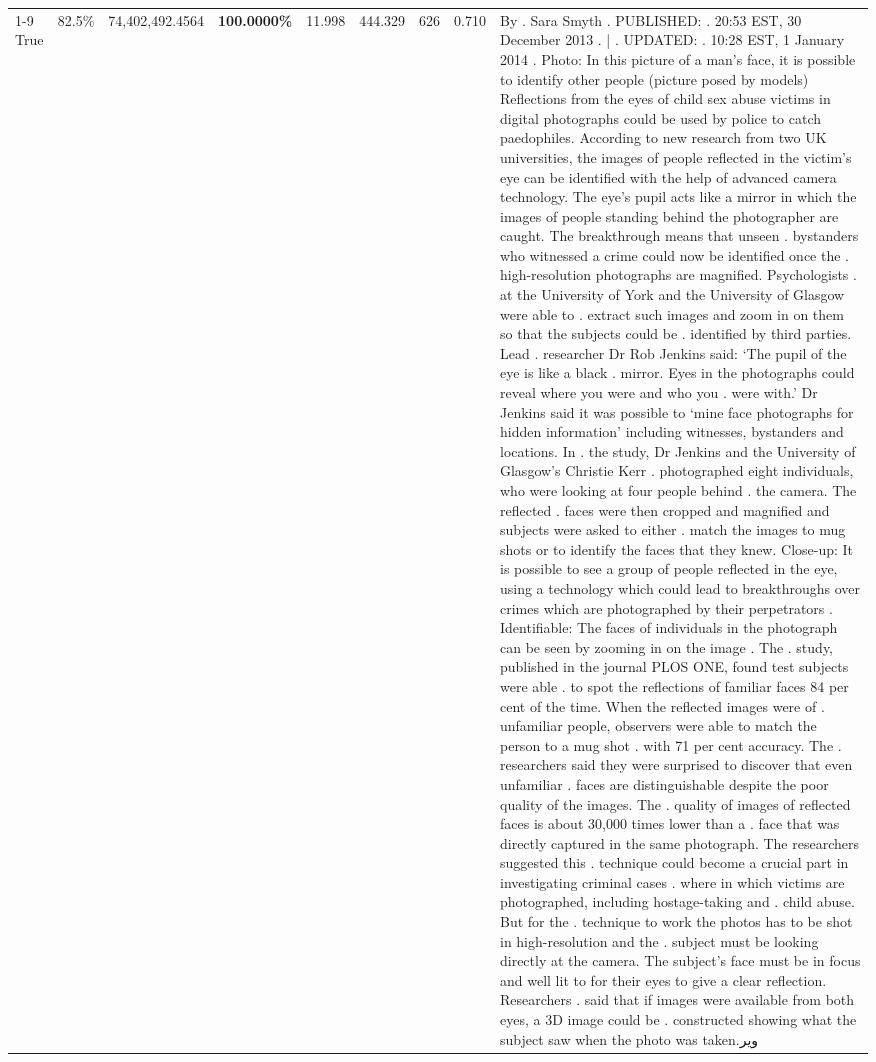 \begin{table}[H]
\begin{tabular}{lllrlllll}
\cline{1-9}
True & 82.5\% & 74,402,492.4564 & \bfseries \color{red} 100.0000\% & 11.998 & 444.329 & 626 & 0.710 & By . Sara Smyth . PUBLISHED: . 20:53 EST, 30 December 2013 . | . UPDATED: . 10:28 EST, 1 January 2014 . Photo: In this picture of a man's face, it is possible to identify other people (picture posed by models) Reflections from the eyes of child sex abuse victims in digital photographs could be used by police to catch paedophiles. According to new research from two UK universities, the images of people reflected in the victim's eye can be identified with the help of advanced camera technology. The eye's pupil acts like a mirror in which the images of people standing behind the photographer are caught. The breakthrough means that unseen . bystanders who witnessed a crime could now be identified once the . high-resolution photographs are magnified. Psychologists . at the University of York and the University of Glasgow were able to . extract such images and zoom in on them so that the subjects could be . identified by third parties. Lead . researcher Dr Rob Jenkins said: ‘The pupil of the eye is like a black . mirror. Eyes in the photographs could reveal where you were and who you . were with.' Dr Jenkins said it was possible to ‘mine face photographs for hidden information' including witnesses, bystanders and locations. In . the study, Dr Jenkins and the University of Glasgow's Christie Kerr . photographed eight individuals, who were looking at four people behind . the camera. The reflected . faces were then cropped and magnified and subjects were asked to either . match the images to mug shots or to identify the faces that they knew. Close-up: It is possible to see a group of people reflected in the eye, using a technology which could lead to breakthroughs over crimes which are photographed by their perpetrators . Identifiable: The faces of individuals in the photograph can be seen by zooming in on the image . The . study, published in the journal PLOS ONE, found test subjects were able . to spot the reflections of familiar faces 84 per cent of the time. When the reflected images were of . unfamiliar people, observers were able to match the person to a mug shot . with 71 per cent accuracy. The . researchers said they were surprised to discover that even unfamiliar . faces are distinguishable despite the poor quality of the images. The . quality of images of reflected faces is about 30,000 times lower than a . face that was directly captured in the same photograph. The researchers suggested this . technique could become a crucial part in investigating criminal cases . where in which victims are photographed, including hostage-taking and . child abuse. But for the . technique to work the photos has to be shot in high-resolution and the . subject must be looking directly at the camera. The subject's face must be in focus and well lit to for their eyes to give a clear reflection. Researchers . said that if images were available from both eyes, a 3D image could be . constructed showing what the subject saw when the photo was taken.وير \\

\end{tabular}
\end{table}
